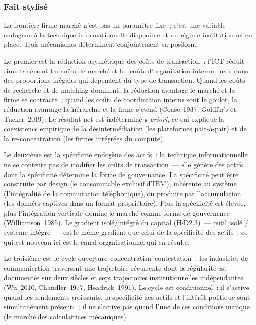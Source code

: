 \subsubsection{Fait stylisé}

La frontière firme-marché n'est pas un paramètre fixe~; c'est une variable endogène à la technique informationnelle disponible et au régime institutionnel en place. Trois mécanismes déterminent conjointement sa position.

Le premier est la réduction asymétrique des coûts de transaction~: l'ICT réduit simultanément les coûts de marché et les coûts d'organisation interne, mais dans des proportions inégales qui dépendent du type de transaction. Quand les coûts de recherche et de matching dominent, la réduction avantage le marché et la firme se contracte~; quand les coûts de coordination interne sont le goulot, la réduction avantage la hiérarchie et la firme s'étend (Coase~1937, Goldfarb et Tucker~2019). Le résultat net est indéterminé \emph{a priori}, ce qui explique la coexistence empirique de la désintermédiation (les plateformes pair-à-pair) et de la re-concentration (les firmes intégrées du compute).

Le deuxième est la spécificité endogène des actifs~: la technique informationnelle ne se contente pas de modifier les coûts de transaction~--- elle génère des actifs dont la spécificité détermine la forme de gouvernance. La spécificité peut être construite par design (le consommable exclusif d'IBM), inhérente au système (l'intégralité de la commutation téléphonique), ou produite par l'accumulation (les données captives dans un format propriétaire). Plus la spécificité est élevée, plus l'intégration verticale domine le marché comme forme de gouvernance (Williamson~1985). Le gradient isolé/intégré du capital (H-D2.3)~--- outil isolé / système intégré~--- est le même gradient que celui de la spécificité des actifs~; ce qui est nouveau ici est le canal organisationnel qui en résulte.

Le troisième est le cycle ouverture--concentration--contestation~: les industries de communication traversent une trajectoire récurrente dont la régularité est documentée sur deux siècles et sept trajectoires institutionnelles indépendantes (Wu~2010, Chandler~1977, Headrick~1991). Le cycle est conditionnel~: il s'active quand les rendements croissants, la spécificité des actifs et l'intérêt politique sont simultanément présents~; il ne s'active pas quand l'une de ces conditions manque (le marché des calculatrices mécaniques).

